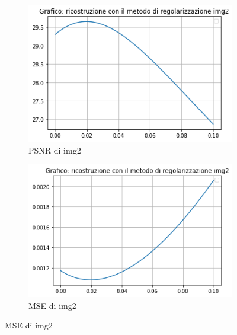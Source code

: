\begin{figure}[H]
    \begin{subfigure}{0.5\textwidth}
        \centering
        \includegraphics[width=\textwidth]{output/PSNR/outputPSNR-img2.png}
        \caption{PSNR di img2}
        \label{fig:img2PSNR}
    \end{subfigure}\hfill
    \begin{subfigure}{0.5\textwidth}
        \centering
        \includegraphics[width=\textwidth]{output/MSE/outputMSE-img2.png}
        \caption{MSE di img2}
        \label{fig:img2MSE}
    \end{subfigure}


\end{figure}
